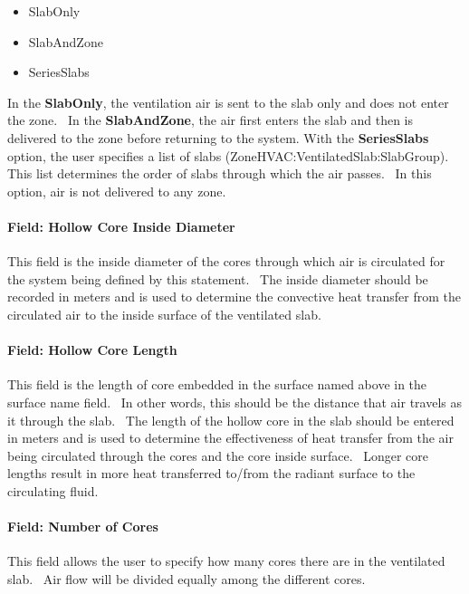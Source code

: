 \begin{itemize}
\item
  SlabOnly
\item
  SlabAndZone
\item
  SeriesSlabs
\end{itemize}

In the \textbf{SlabOnly}, the ventilation air is sent to the slab only and does not enter the zone.~ In the \textbf{SlabAndZone}, the air first enters the slab and then is delivered to the zone before returning to the system. With the \textbf{SeriesSlabs} option, the user specifies a list of slabs (ZoneHVAC:VentilatedSlab:SlabGroup). This list determines the order of slabs through which the air passes.~ In this option, air is not delivered to any zone.

\paragraph{Field: Hollow Core Inside Diameter}\label{field-hollow-core-inside-diameter}

This field is the inside diameter of the cores through which air is circulated for the system being defined by this statement.~ The inside diameter should be recorded in meters and is used to determine the convective heat transfer from the circulated air to the inside surface of the ventilated slab.

\paragraph{Field: Hollow Core Length}\label{field-hollow-core-length}

This field is the length of core embedded in the surface named above in the surface name field.~ In other words, this should be the distance that air travels as it through the slab.~ The length of the hollow core in the slab should be entered in meters and is used to determine the effectiveness of heat transfer from the air being circulated through the cores and the core inside surface.~ Longer core lengths result in more heat transferred to/from the radiant surface to the circulating fluid.

\paragraph{Field: Number of Cores}\label{field-number-of-cores}

This field allows the user to specify how many cores there are in the ventilated slab.~ Air flow will be divided equally among the different cores.

